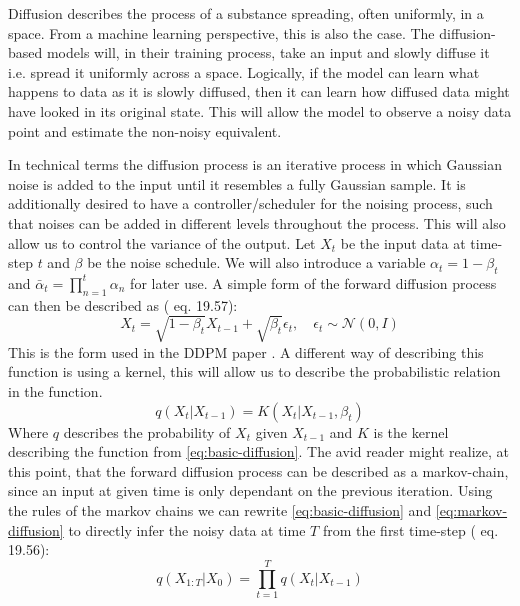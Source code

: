\documentclass[a4paper, 12pt]{olplainarticle}
\begin{document}
Diffusion describes the process of a substance spreading, often uniformly, in a space. 
From a machine learning perspective, this is also the case. 
The diffusion-based models will, in their training process, take an input and slowly diffuse it i.e. spread it uniformly across a space.
Logically, if the model can learn what happens to data as it is slowly diffused, then it can learn how diffused data might have looked in its original state.
This will allow the model to observe a noisy data point and estimate the non-noisy equivalent.

In technical terms the diffusion process is an iterative process in which Gaussian noise is added to the input until it resembles a fully Gaussian sample.
It is additionally desired to have a controller/scheduler for the noising process, such that noises can be added in different levels throughout the process.
This will also allow us to control the variance of the output.
Let $X_t$ be the input data at time-step $t$ and $\beta$ be the noise schedule. We will also introduce a variable $\alpha_t = 1-\beta_t$ and $\bar{\alpha}_t = \prod_{n=1}^t \alpha_n$ for later use.
A simple form of the forward diffusion process can then be described as \citep{intro-diffusion-process} (\cite{ml-book} eq. 19.57):
\begin{equation} \label{eq:basic-diffusion}
    X_t = \sqrt{1-\beta_t} X_{t-1} + \sqrt{\beta_t} \epsilon_t, \quad \epsilon_t \sim \mathcal{N}(0,I)
\end{equation}
This is the form used in the DDPM paper \citep{ddpm}.
A different way of describing this function is using a kernel, this will allow us to describe the probabilistic relation in the function.
\begin{equation} \label{eq:markov-diffusion}
    q(X_t|X_{t-1}) = K(X_t | X_{t-1}, \beta_t)
\end{equation}
Where $q$ describes the probability of $X_t$ given $X_{t-1}$ and $K$ is the kernel describing the function from \cref{eq:basic-diffusion}.
The avid reader might realize, at this point, that the forward diffusion process can be described as a markov-chain, 
since an input at given time is only dependant on the previous iteration.
Using the rules of the markov chains we can rewrite \cref{eq:basic-diffusion} and \cref{eq:markov-diffusion} to directly infer the noisy data at time $T$ from the first time-step (\cite{ml-book} eq. 19.56):
\begin{equation}
    q(X_{1:T}| X_0) = \prod_{t=1}^{T}q(X_t|X_{t-1})
\end{equation}
\end{document}
